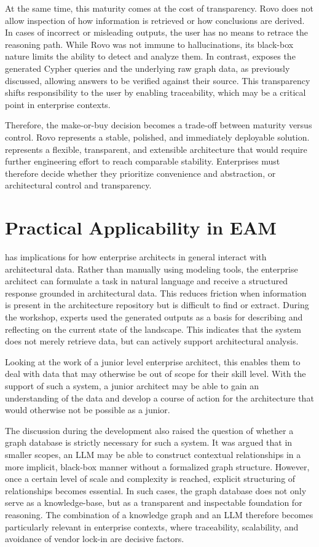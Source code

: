 At the same time, this maturity comes at the cost of transparency. Rovo does not allow inspection of how information is retrieved or how conclusions are derived. In cases of incorrect or misleading outputs, the user has no means to retrace the reasoning path. While Rovo was not immune to hallucinations, its black-box nature limits the ability to detect and analyze them. In contrast, \prototype{} exposes the generated Cypher queries and the underlying raw graph data, as previously discussed, allowing answers to be verified against their source. This transparency shifts responsibility to the user by enabling  traceability, which may be a critical point in enterprise contexts.

Therefore, the make-or-buy decision becomes a trade-off between maturity versus control. Rovo represents a stable, polished, and immediately deployable solution. \prototype{} represents a flexible, transparent, and extensible architecture that would require further engineering effort to reach comparable stability. Enterprises must therefore decide whether they prioritize convenience and abstraction, or architectural control and transparency.

\section{Practical Applicability in EAM}
\label{sub:practicalApplicability}
\prototype{} has implications for how enterprise architects in general interact with architectural data. Rather than manually using modeling tools, the enterprise architect can formulate a task in natural language and receive a structured response grounded in architectural data. This reduces friction when information is present in the architecture repository but is difficult to find or extract. During the workshop, experts used the generated outputs as a basis for describing and reflecting on the current state of the landscape. This indicates that the system does not merely retrieve data, but can actively support architectural analysis.

Looking at the work of a junior level enterprise architect, this enables them to deal with data that may otherwise be out of scope for their skill level. With the support of such a system, a junior architect may be able to gain an understanding of the data and develop a course of action for the architecture that would otherwise not be possible as a junior.

The discussion during the development also raised the question of whether a graph database is strictly necessary for such a system. It was argued that in smaller scopes, an LLM may be able to construct contextual relationships in a more implicit, black-box manner without a formalized graph structure. However, once a certain level of scale and complexity is reached, explicit structuring of relationships becomes essential. In such cases, the graph database does not only serve as a knowledge-base, but as a transparent and inspectable foundation for reasoning. The combination of a knowledge graph and an LLM therefore becomes particularly relevant in enterprise contexts, where traceability, scalability, and avoidance of vendor lock-in are decisive factors.

